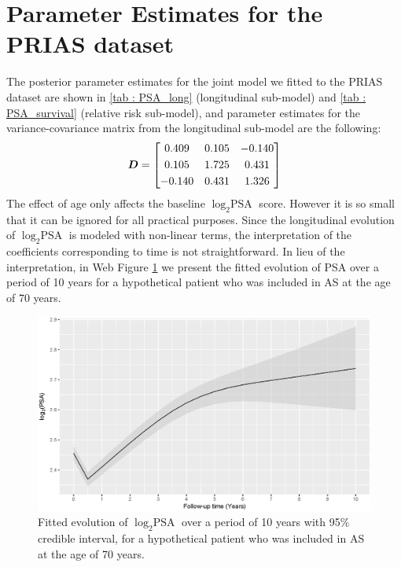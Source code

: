 
\section{Parameter Estimates for the PRIAS dataset}
\label{sec : param_estimates_jm_fit_prias}
The posterior parameter estimates for the joint model we fitted to the PRIAS dataset are shown in \ref{tab : PSA_long} (longitudinal sub-model) and \ref{tab : PSA_survival} (relative risk sub-model), and parameter estimates for the variance-covariance matrix from the longitudinal sub-model are the following:
\begin{equation*}
\boldsymbol{D} = \begin{bmatrix}
       0.409 & 0.105 & -0.140 \\[0.3em]
       0.105 & 1.725 & 0.431 \\[0.3em]
       -0.140 & 0.431 & 1.326
     \end{bmatrix}
\end{equation*} 
The effect of age only affects the baseline $\log_2 \mbox{PSA}$ score. However it is so small that it can be ignored for all practical purposes. Since the longitudinal evolution of $\log_2 \mbox{PSA}$ is modeled with non-linear terms, the interpretation of the coefficients corresponding to time is not straightforward. In lieu of the interpretation, in Web Figure \ref{fig : fitted_trend_psa} we present the fitted evolution of PSA over a period of 10 years for a hypothetical patient who was included in AS at the age of 70 years.

\begin{figure}[!htb]
\centerline{\includegraphics[width=\columnwidth]{images/fitted_trend_psa.eps}}
\caption{Fitted evolution of $\log_2 \mbox{PSA}$ over a period of 10 years with 95\% credible interval, for a hypothetical patient who was included in AS at the age of 70 years.}
\label{fig : fitted_trend_psa}
\end{figure}

